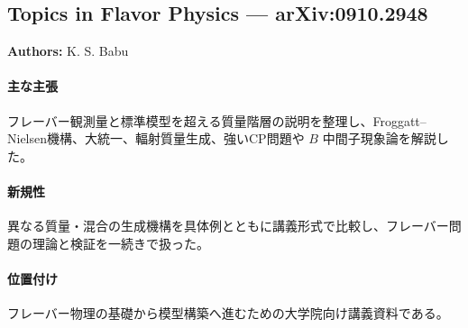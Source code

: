 \subsection{Topics in Flavor Physics --- arXiv:0910.2948}

\textbf{Authors:} K. S. Babu

\paragraph{主な主張}
フレーバー観測量と標準模型を超える質量階層の説明を整理し、Froggatt--Nielsen機構、大統一、輻射質量生成、強いCP問題や $B$ 中間子現象論を解説した\cite{Babu:2009fd}。

\paragraph{新規性}
異なる質量・混合の生成機構を具体例とともに講義形式で比較し、フレーバー問題の理論と検証を一続きで扱った。

\paragraph{位置付け}
フレーバー物理の基礎から模型構築へ進むための大学院向け講義資料である。
